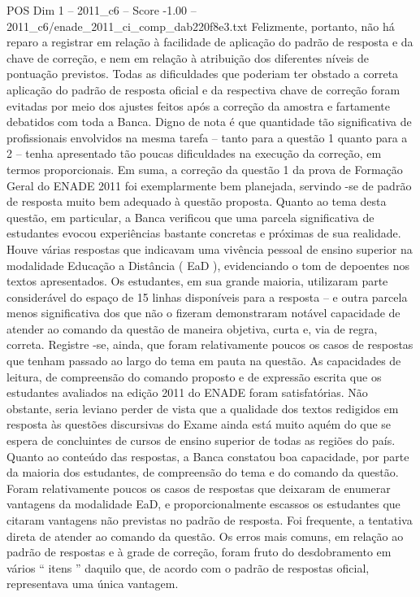 \begin{textsample}{POS Dim 1 – 2011\_c6 – Score -1.00 – 2011\_c6/enade\_2011\_ci\_comp\_dab220f8e3.txt}
Felizmente, portanto, não há reparo a registrar em relação à facilidade de aplicação do padrão de resposta e da chave de correção, e nem em relação à atribuição dos diferentes níveis de pontuação previstos.
Todas as dificuldades que poderiam ter obstado a correta aplicação do padrão de resposta oficial e da respectiva chave de correção foram evitadas por meio dos ajustes feitos após a correção da amostra e fartamente debatidos com toda a Banca.
Digno de nota é que quantidade tão significativa de profissionais envolvidos na mesma tarefa – tanto para a questão 1 quanto para a 2 – tenha apresentado tão poucas dificuldades na execução da correção, em termos proporcionais.
Em suma, a correção da questão 1 da prova de Formação Geral do ENADE 2011 foi exemplarmente bem planejada, servindo -se de padrão de resposta muito bem adequado à questão proposta.
Quanto ao tema desta questão, em particular, a Banca verificou que uma parcela significativa de estudantes evocou experiências bastante concretas e próximas de sua realidade.
Houve várias respostas que indicavam uma vivência pessoal de ensino superior na modalidade Educação a Distância ( EaD ), evidenciando o tom de depoentes nos textos apresentados.
Os estudantes, em sua grande maioria, utilizaram parte considerável do espaço de 15 linhas disponíveis para a resposta – e outra parcela menos significativa dos que não o fizeram demonstraram notável capacidade de atender ao comando da questão de maneira objetiva, curta e, via de regra, correta.
Registre -se, ainda, que foram relativamente poucos os casos de respostas que tenham passado ao largo do tema em pauta na questão.
As capacidades de leitura, de compreensão do comando proposto e de expressão escrita que os estudantes avaliados na edição 2011 do ENADE foram satisfatórias.
Não obstante, seria leviano perder de vista que a qualidade dos textos redigidos em resposta às questões discursivas do Exame ainda está muito aquém do que se espera de concluintes de cursos de ensino superior de todas as regiões do país.
Quanto ao conteúdo das respostas, a Banca constatou boa capacidade, por parte da maioria dos estudantes, de compreensão do tema e do comando da questão.
Foram relativamente poucos os casos de respostas que deixaram de enumerar vantagens da modalidade EaD, e proporcionalmente escassos os estudantes que citaram vantagens não previstas no padrão de resposta.
Foi frequente, a tentativa direta de atender ao comando da questão.
Os erros mais comuns, em relação ao padrão de respostas e à grade de correção, foram fruto do desdobramento em vários “ itens ” daquilo que, de acordo com o padrão de respostas oficial, representava uma única vantagem.

\end{textsample}
